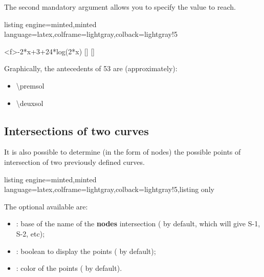 \documentclass[11pt,a4paper]{ltxdoc}
\begin{document}
\smallskip

The second mandatory argument allows you to specify the value to reach.

\begin{tcblisting}{listing engine=minted,minted language=latex,colframe=lightgray,colback=lightgray!5}
\begin{GraphTikz}%
	[x=0.9cm,y=0.425cm,Xmin=4,Xmax=20,Origx=4,
	Ymin=40,Ymax=56,Ygrid=2,Ygrids=1,Origy=40]
	{-2*x+3+24*log(2*x)}
	[\premsol]
	[\deuxsol]
\end{GraphTikz}

Graphically, the antecedents of 53 are (approximately):

\begin{itemize}
	\item \num{\premsol}
	\item \num{\deuxsol}
\end{itemize}
\end{tcblisting}

\pagebreak

\subsection{Intersections of two curves}\label{intersect}

It is also possible to determine (in the form of nodes) the possible points of intersection of two previously defined curves.

\begin{tcblisting}{listing engine=minted,minted language=latex,colframe=lightgray,colback=lightgray!5,listing only}
\end{tcblisting}

The optional \MontreCode{[keys]} available are:

\smallskip

\begin{itemize}
	\item {}: base of the name of the \textbf{nodes} intersection ( by default, which will give \textsf{S-1}, \textsf{S-2}, etc);
	\item {}: boolean to display the points ( by default);
	\item {}: color of the points ( by default).
\end{itemize}
\end{document}
